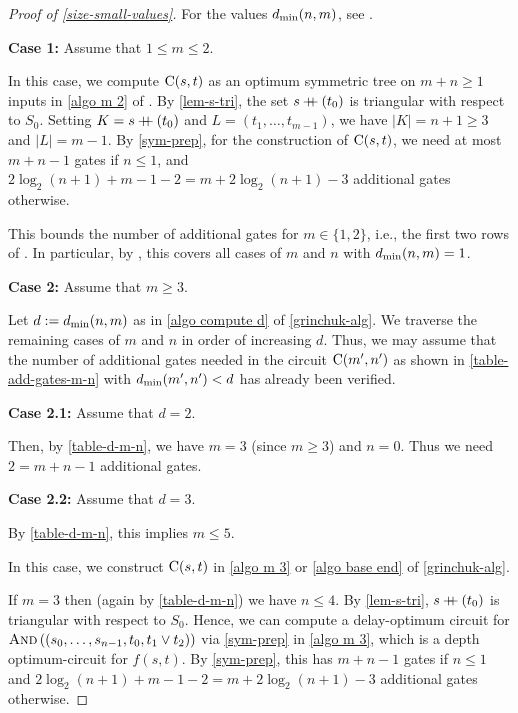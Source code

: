 \spacingbetweenappproofs


\begin{proof}[Proof of \cref{size-small-values}] \label{proof-size-small-values}
 For the values $d_{\min}(n, m)$, see .

 \textbf{Case 1:} Assume that $1 \leq m \leq 2$.

 In this case, we compute $\operatorname{C}(s, t)$ as an optimum symmetric tree on $m + n \geq 1$ inputs in \cref{algo m 2} of .
 By \cref{lem-s-tri}, the set $s \mathbin{+\mkern-8mu+} (t_0)$ is triangular with respect to $S\!_0$.
 Setting $K = s \mathbin{+\mkern-8mu+} (t_0)$ and $L = (t_1, \dotsc, t_{m-1})$,
 we have $|K| = n + 1 \geq 3$ and $|L| = m - 1$.
 By \cref{sym-prep},
 for the construction of $\operatorname{C}(s, t)$,
 we need at most $m + n - 1$ gates if $n \leq 1$,
 and $2 \log_2(n+1) + m - 1 - 2 = m + 2 \log_2(n+1) - 3$ additional gates otherwise.

 This bounds the number of additional gates for $m \in \{1, 2\}$, i.e., the first two rows of .
 In particular, by , this covers all cases of $m$ and $n$ with $d_{\min}(n, m) = 1$.

\textbf{Case 2:} Assume that $m \geq 3$.

Let $d := d_{\min}(n, m)$ as in \cref{algo compute d} of \cref{grinchuk-alg}.
We traverse the remaining cases of $m$ and $n$ in order of increasing $d$.
Thus, we may assume that the number of additional gates needed in the circuit $\operatorname{C}(m', n')$ as shown in \cref{table-add-gates-m-n}
with $d_{\min}(m', n') < d$ has already been verified.

\textbf{Case 2.1:} Assume that $d = 2$.

Then, by \cref{table-d-m-n}, we have $m=3$ (since $m \geq 3$) and $n=0$.
Thus we need $2 = m + n - 1$ additional gates.

\textbf{Case 2.2:} Assume that $d = 3$.

By \cref{table-d-m-n}, this implies $m \leq 5.$

In this case, we construct $\operatorname{C}(s, t)$ in \cref{algo m 3} or \cref{algo base end} of \cref{grinchuk-alg}.

If $m = 3$ then (again by \cref{table-d-m-n}) we have $n \leq 4$.
 By \cref{lem-s-tri}, $s \mathbin{+\mkern-8mu+} (t_0)$ is triangular with respect to $S\!_0$.
 Hence, we can compute a delay-optimum circuit for
 $\operatorname{\textsc{And}}\left({\left({s_0, \dotsc, s_{n-1}, t_0, t_1 \lor t_2}\right)}\right)$
 via \cref{sym-prep} in \cref{algo m 3},
 which is a depth optimum-circuit for $f(s, t)$.
 By \cref{sym-prep}, this has $m + n - 1$ gates if $n \leq 1$
 and $2 \log_2(n+1) + m - 1 - 2 = m + 2 \log_2(n+1) - 3$ additional gates otherwise.


\end{proof}
